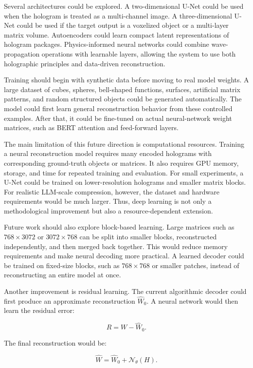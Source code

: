 \documentclass{article}
\begin{document}
\begin{normalsize}
Several architectures could be explored. A two-dimensional U-Net could be used when the hologram is treated as a multi-channel image. A three-dimensional U-Net could be used if the target output is a voxelized object or a multi-layer matrix volume. Autoencoders could learn compact latent representations of hologram packages. Physics-informed neural networks could combine wave-propagation operations with learnable layers, allowing the system to use both holographic principles and data-driven reconstruction.

Training should begin with synthetic data before moving to real model weights. A large dataset of cubes, spheres, bell-shaped functions, surfaces, artificial matrix patterns, and random structured objects could be generated automatically. The model could first learn general reconstruction behavior from these controlled examples. After that, it could be fine-tuned on actual neural-network weight matrices, such as BERT attention and feed-forward layers.

The main limitation of this future direction is computational resources. Training a neural reconstruction model requires many encoded holograms with corresponding ground-truth objects or matrices. It also requires GPU memory, storage, and time for repeated training and evaluation. For small experiments, a U-Net could be trained on lower-resolution holograms and smaller matrix blocks. For realistic LLM-scale compression, however, the dataset and hardware requirements would be much larger. Thus, deep learning is not only a methodological improvement but also a resource-dependent extension.

Future work should also explore block-based learning. Large matrices such as \(768 \times 3072\) or \(3072 \times 768\) can be split into smaller blocks, reconstructed independently, and then merged back together. This would reduce memory requirements and make neural decoding more practical. A learned decoder could be trained on fixed-size blocks, such as \(768 \times 768\) or smaller patches, instead of reconstructing an entire model at once.

Another improvement is residual learning. The current algorithmic decoder could first produce an approximate reconstruction \(\hat{W}_{0}\). A neural network would then learn the residual error:

\[
R = W - \hat{W}_{0}.
\]

The final reconstruction would be:

\[
\hat{W} = \hat{W}_{0} + \mathcal{N}_{\theta}(H).
\]


\end{normalsize}
\end{document}
